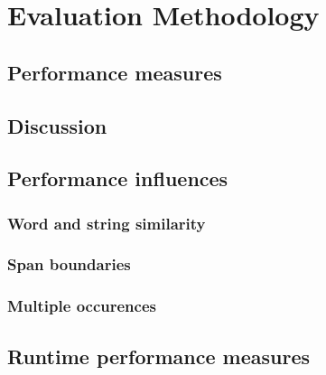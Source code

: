 \section{Evaluation Methodology}

\subsection{Performance measures}

\subsection{Discussion}

\subsection{Performance influences}

\subsubsection{Word and string similarity}
\subsubsection{Span boundaries}
\subsubsection{Multiple occurences}

\subsection{Runtime performance measures}